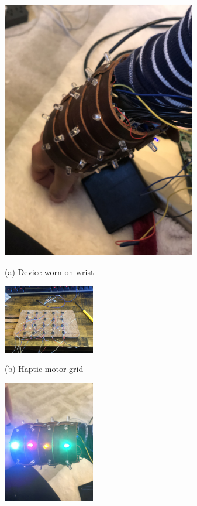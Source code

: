 \documentclass{article}
\begin{document}
\begin{center}
\begin{figure}[ht]

\begin{minipage}[b]{1.0\linewidth}
  \centering
  \centerline{\includegraphics[width=8.5cm]{worn.JPG}}
  \centerline{(a) Device worn on wrist}\medskip
\end{minipage}
%
\begin{minipage}[b]{.48\linewidth}
  \centering
  \centerline{\includegraphics[width=4.0cm]{hapticmotors.JPG}}
  \centerline{(b) Haptic motor grid}\medskip
\end{minipage}
\hfill
\begin{minipage}[b]{0.48\linewidth}
  \centering
  \centerline{\includegraphics[width=4.0cm]{lit.JPG}}

\end{minipage}
\end{figure}
\end{center}
\end{document}
